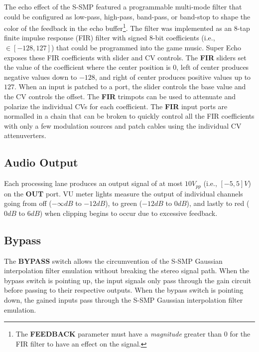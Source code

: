 \documentclass[12pt,letter]{article}
\begin{document}
The echo effect of the S-SMP featured a programmable multi-mode filter that could be configured as low-pass, high-pass, band-pass, or band-stop to shape the color of the feedback in the echo buffer\footnote{The \textbf{FEEDBACK} parameter must have a \textit{magnitude} greater than $0$ for the FIR filter to have an effect on the signal.}. The filter was implemented as an 8-tap finite impulse response (FIR) filter with signed 8-bit coefficients (i.e., $\in [-128, 127]$) that could be programmed into the game music. Super Echo exposes these FIR coefficients with slider and CV controls. The \textbf{FIR} sliders set the value of the coefficient where the center position is $0$, left of center produces negative values down to $-128$, and right of center produces positive values up to $127$. When an input is patched to a port, the slider controls the base value and the CV controls the offset. The \textbf{FIR} trimpots can be used to attenuate and polarize the individual CVs for each coefficient. The \textbf{FIR} input ports are normalled in a chain that can be broken to quickly control all the FIR coefficients with only a few modulation sources and patch cables using the individual CV attenuverters.

\subsection{Audio Output}

Each processing lane produces an output signal of at most $10V_{pp}$ (i.e., $[-5, 5]V$) on the \textbf{OUT} port. VU meter lights measure the output of individual channels going from off ($-\infty dB$ to $-12dB$), to green ($-12dB$ to $0dB$), and lastly to red ($0dB$ to $6dB$) when clipping begins to occur due to excessive feedback.

\subsection{Bypass}

The \textbf{BYPASS} switch allows the circumvention of the S-SMP Gaussian interpolation filter emulation without breaking the stereo signal path. When the bypass switch is pointing up, the input signals only pass through the gain circuit before passing to their respective outputs. When the bypass switch is pointing down, the gained inputs pass through the S-SMP Gaussian interpolation filter emulation.
\end{document}
